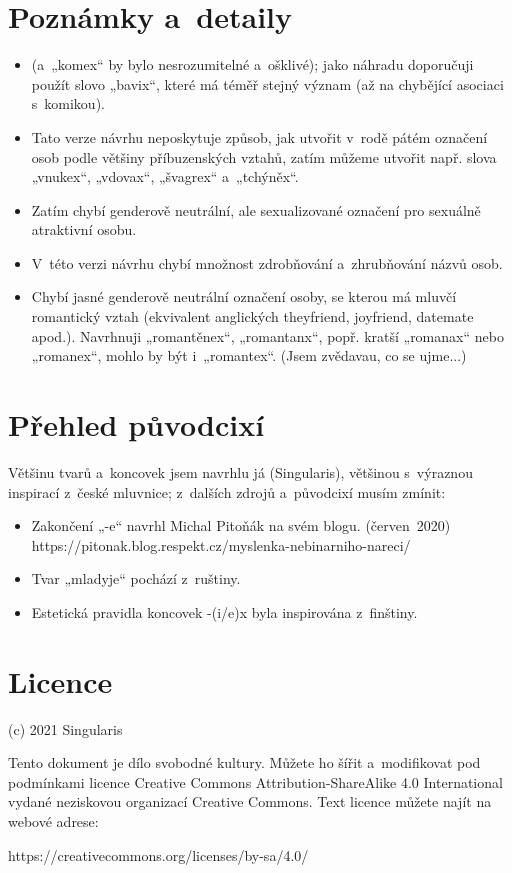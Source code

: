 \section{Poznámky a detaily}
\begin{itemize}
\item{} (a „komex“ by bylo nesrozumitelné a ošklivé);
jako náhradu doporučuji použít slovo „bavix“, které má téměř stejný význam (až na chybějící asociaci s komikou).
\item Tato verze návrhu neposkytuje způsob, jak utvořit v rodě pátém označení osob podle většiny příbuzenských vztahů, zatím můžeme utvořit např. slova „vnukex“, „vdovax“, „švagrex“ a „tchýněx“.
\item Zatím chybí genderově neutrální, ale sexualizované označení pro sexuálně atraktivní osobu.
\item V této verzi návrhu chybí množnost zdrobňování a zhrubňování názvů osob.
\item Chybí jasné genderově neutrální označení osoby, se kterou má mluvčí romantický vztah (ekvivalent anglických they\-friend, joy\-friend, date\-mate apod.). Navrhnuji „romantěnex“, „romantanx“, popř. kratší „romanax“ nebo „romanex“, mohlo by být i „romantex“. (Jsem zvědavau, co se ujme...)
\end{itemize}

\section{Přehled původcixí}

Většinu tvarů a koncovek jsem navrhlu já (Singularis), většinou s výraznou
inspirací z české mluvnice; z dalších zdrojů a původcixí musím zmínit:

\begin{itemize}
\item Zakončení „-e“ navrhl Michal Pitoňák na svém blogu. (červen 2020)\\{}https://pitonak.blog.respekt.cz/myslenka-nebinarniho-nareci/
\item Tvar „mladyje“ pochází z ruštiny.
\item Estetická pravidla koncovek -(i/e)x byla inspirována z finštiny.
\end{itemize}

\section{Licence}

\noindent (c) 2021 Singularis

Tento dokument je dílo svobodné kultury. Můžete ho šířit a modifikovat pod
podmínkami licence Creative Commons Attribution-ShareAlike 4.0 International
vydané neziskovou organizací Creative Commons. Text licence
můžete najít na webové adrese:

https://creativecommons.org/licenses/by-sa/4.0/


